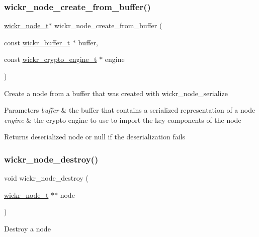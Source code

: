 \subsubsection{\texorpdfstring{wickr\+\_\+node\+\_\+create\+\_\+from\+\_\+buffer()}{wickr\_node\_create\_from\_buffer()}}
{\footnotesize\ttfamily \mbox{\hyperlink{structwickr__node}{wickr\+\_\+node\+\_\+t}}$\ast$ wickr\+\_\+node\+\_\+create\+\_\+from\+\_\+buffer (\begin{DoxyParamCaption}\item[{const \mbox{\hyperlink{structwickr__buffer}{wickr\+\_\+buffer\+\_\+t}} $\ast$}]{buffer,  }\item[{const \mbox{\hyperlink{structwickr__crypto__engine}{wickr\+\_\+crypto\+\_\+engine\+\_\+t}} $\ast$}]{engine }\end{DoxyParamCaption})}

Create a node from a buffer that was created with \textquotesingle{}wickr\+\_\+node\+\_\+serialize\textquotesingle{}


\begin{DoxyParams}{Parameters}
{\em buffer} & the buffer that contains a serialized representation of a node \\
\hline
{\em engine} & the crypto engine to use to import the key components of the node \\
\hline
\end{DoxyParams}
\begin{DoxyReturn}{Returns}
deserialized node or null if the deserialization fails 
\end{DoxyReturn}
\mbox{\label{group__wickr__node_ga6acf07885403d9df6baad36a8d797f73}} 
\subsubsection{\texorpdfstring{wickr\+\_\+node\+\_\+destroy()}{wickr\_node\_destroy()}}
{\footnotesize\ttfamily void wickr\+\_\+node\+\_\+destroy (\begin{DoxyParamCaption}\item[{\mbox{\hyperlink{structwickr__node}{wickr\+\_\+node\+\_\+t}} $\ast$$\ast$}]{node }\end{DoxyParamCaption})}

Destroy a node


